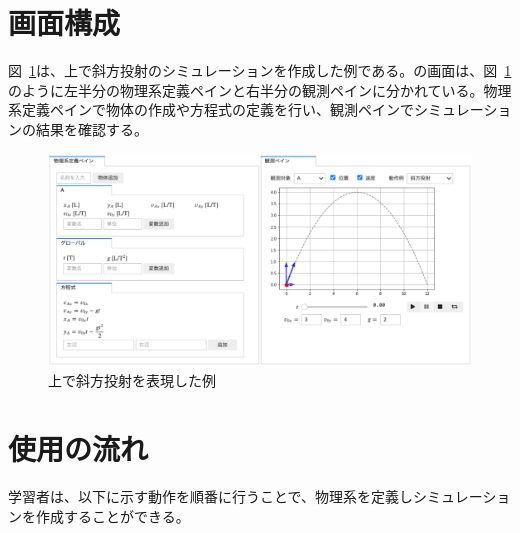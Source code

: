 \section{画面構成}

図~\ref{simsym_fig1}は、\simname 上で斜方投射のシミュレーションを作成した例である。\simname の画面は、図~\ref{simsym_fig1}のように左半分の物理系定義ペインと右半分の観測ペインに分かれている。物理系定義ペインで物体の作成や方程式の定義を行い、観測ペインでシミュレーションの結果を確認する。

\begin{figure}[bht]
  \centering
  \includegraphics*[width=\linewidth]{work/simsym_example-crop.pdf}
  \caption{\simname 上で斜方投射を表現した例} \label{simsym_fig1}
\end{figure}

\section{使用の流れ}
学習者は、以下に示す動作を順番に行うことで、物理系を定義しシミュレーションを作成することができる。

